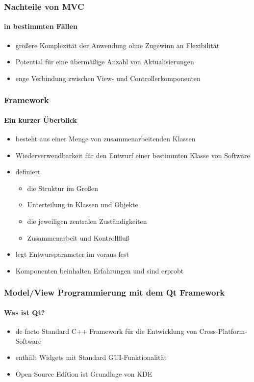 \begin{frame}
	\frametitle{Nachteile von MVC}
	\framesubtitle{in bestimmten Fällen}
	\begin{itemize}
		\item größere Komplexität der Anwendung ohne Zugewinn an Flexibilität
		\item Potential für eine übermäßige Anzahl von Aktualisierungen
		\item enge Verbindung zwischen View- und Controllerkomponenten
	\end{itemize}
\end{frame}

\begin{frame}
	\frametitle{Framework}
	\framesubtitle{Ein kurzer Überblick}
	\begin{itemize}
		\item besteht aus einer Menge von zusammenarbeitenden Klassen
		\item Wiederverwendbarkeit für den Entwurf einer bestimmten Klasse
		von Software
		\item definiert
		\begin{itemize}
			\item die Struktur im Großen
			\item Unterteilung in Klassen und Objekte
			\item die jeweiligen zentralen Zuständigkeiten
			\item Zusammenarbeit und Kontrollfluß
		\end{itemize}
		\item legt Entwursparameter im voraus fest
		\item Komponenten beinhalten Erfahrungen und sind erprobt
	\end{itemize}
\end{frame}

\begin{frame}
	\frametitle{Model/View Programmierung mit dem Qt Framework}
	\framesubtitle{Was ist Qt?}
	\begin{itemize}
		\item de facto Standard C++ Framework für die Entwicklung
		von Cross-Platform-Software
		\item enthält Widgets mit Standard GUI-Funktionalität
		\item Open Source Edition ist Grundlage von KDE
	\end{itemize}
\end{frame}

